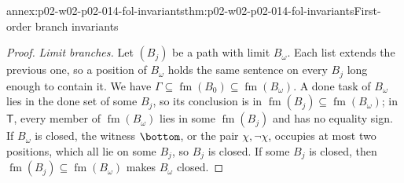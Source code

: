 \begin{annexitem}{annex:p02-w02-p02-014-fol-invariants}{thm:p02-w02-p02-014-fol-invariants}{First-order branch invariants}
\begin{proof}
\emph{Limit branches.}  Let \((B_j)\) be a path with limit \(B_\omega\).  Each
list extends the previous one, so a position of \(B_\omega\) holds the same
sentence on every \(B_j\) long enough to contain it.  We have
\(\Gamma\subseteq\operatorname{fm}(B_0)\subseteq\operatorname{fm}(B_\omega)\).  A done task of \(B_\omega\)
lies in the done set of some \(B_j\), so its conclusion is in
\(\operatorname{fm}(B_j)\subseteq\operatorname{fm}(B_\omega)\); in \(\mathsf T\), every member of
\(\operatorname{fm}(B_\omega)\) lies in some \(\operatorname{fm}(B_j)\) and has no equality sign.  If
\(B_\omega\) is closed, the witness \(\bottom\), or the pair \(\chi,\neg\chi\),
occupies at most two positions, which all lie on some \(B_j\), so \(B_j\) is
closed.  If some \(B_j\) is closed, then \(\operatorname{fm}(B_j)\subseteq\operatorname{fm}(B_\omega)\) makes
\(B_\omega\) closed.
\end{proof}
\end{annexitem}

